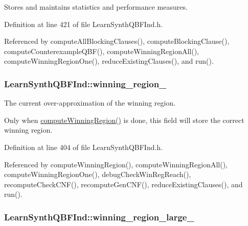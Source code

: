 Stores and maintains statistics and performance measures. 



Definition at line 421 of file Learn\-Synth\-Q\-B\-F\-Ind.\-h.



Referenced by compute\-All\-Blocking\-Clauses(), compute\-Blocking\-Clause(), compute\-Counterexample\-Q\-B\-F(), compute\-Winning\-Region\-All(), compute\-Winning\-Region\-One(), reduce\-Existing\-Clauses(), and run().

\hypertarget{classLearnSynthQBFInd_ab8ce6031137413e90e0626bbdc734be0}{
\subsubsection[{winning\-\_\-region\-\_\-}]{ Learn\-Synth\-Q\-B\-F\-Ind\-::winning\-\_\-region\-\_\-\hspace{0.3cm}{\ttfamily [protected]}}}\label{classLearnSynthQBFInd_ab8ce6031137413e90e0626bbdc734be0}


The current over-\/approximation of the winning region. 

Only when \hyperlink{classLearnSynthQBFInd_a41593ccf692af8948f4b1255fb13ffe5}{compute\-Winning\-Region()} is done, this field will store the correct winning region. 

Definition at line 404 of file Learn\-Synth\-Q\-B\-F\-Ind.\-h.



Referenced by compute\-Winning\-Region(), compute\-Winning\-Region\-All(), compute\-Winning\-Region\-One(), debug\-Check\-Win\-Reg\-Reach(), recompute\-Check\-C\-N\-F(), recompute\-Gen\-C\-N\-F(), reduce\-Existing\-Clauses(), and run().

\hypertarget{classLearnSynthQBFInd_a333c9336ba28a2c41f252a3051a59581}{
\subsubsection[{winning\-\_\-region\-\_\-large\-\_\-}]{ Learn\-Synth\-Q\-B\-F\-Ind\-::winning\-\_\-region\-\_\-large\-\_\-\hspace{0.3cm}{\ttfamily [protected]}}}\label{classLearnSynthQBFInd_a333c9336ba28a2c41f252a3051a59581}


